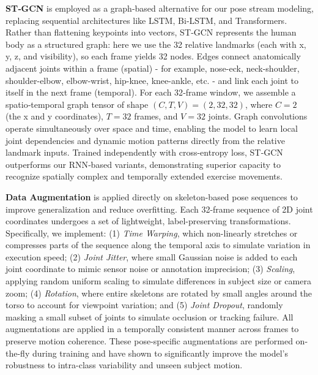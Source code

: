 \documentclass[journal,onecolumn, 11pt]{IEEEtran}
\begin{document}
\textbf{ST‐GCN} is employed as a graph‐based alternative for our pose stream modeling, replacing sequential architectures like LSTM, Bi‐LSTM, and Transformers. Rather than flattening keypoints into vectors, ST‐GCN represents the human body as a structured graph: here we use the 32 relative landmarks (each with x, y, z, and visibility), so each frame yields 32 nodes. Edges connect anatomically adjacent joints within a frame (spatial) - for example, nose-eck, neck-shoulder, shoulder-elbow, elbow-wrist, hip-knee, knee-ankle, etc. - and link each joint to itself in the next frame (temporal). For each 32‐frame window, we assemble a spatio‐temporal graph tensor of shape $(C, T, V) = (2, 32, 32)$, where $C=2$ (the x and y coordinates), $T=32$ frames, and $V=32$ joints. Graph convolutions operate simultaneously over space and time, enabling the model to learn local joint dependencies and dynamic motion patterns directly from the relative landmark inputs. Trained independently with cross-entropy loss, ST‐GCN outperforms our RNN‐based variants, demonstrating superior capacity to recognize spatially complex and temporally extended exercise movements. \cite{yan2018stgcn}

\textbf{Data Augmentation} is applied directly on skeleton-based pose sequences to improve generalization and reduce overfitting. Each 32-frame sequence of 2D joint coordinates undergoes a set of lightweight, label-preserving transformations. Specifically, we implement: (1) \textit{Time Warping}, which non-linearly stretches or compresses parts of the sequence along the temporal axis to simulate variation in execution speed; (2) \textit{Joint Jitter}, where small Gaussian noise is added to each joint coordinate to mimic sensor noise or annotation imprecision; (3) \textit{Scaling}, applying random uniform scaling to simulate differences in subject size or camera zoom; (4) \textit{Rotation}, where entire skeletons are rotated by small angles around the torso to account for viewpoint variation; and (5) \textit{Joint Dropout}, randomly masking a small subset of joints to simulate occlusion or tracking failure. All augmentations are applied in a temporally consistent manner across frames to preserve motion coherence. These pose-specific augmentations are performed on-the-fly during training and have shown to significantly improve the model's robustness to intra-class variability and unseen subject motion.\cite{ko2024augmentation}
\end{document}
